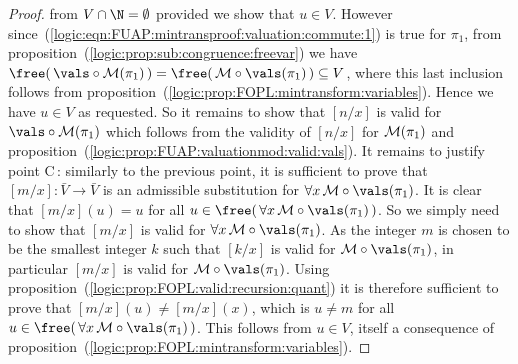 \begin{proof}
from $V\cap\N=\emptyset$ provided we show that $u\in V$. However
since~(\ref{logic:eqn:FUAP:mintransproof:valuation:commute:1}) is
true for $\pi_{1}$, from
proposition~(\ref{logic:prop:sub:congruence:freevar}) we have
$\free(\,\vals\circ{\cal M}(\pi_{1})\,)=\free(\,{\cal
M}\circ\vals(\pi_{1})\,)\subseteq V$, where this last inclusion
follows from
proposition~(\ref{logic:prop:FOPL:mintransform:variables}). Hence we
have $u\in V$ as requested. So it remains to show that $[n/x]$ is
valid for $\vals\circ{\cal M}(\pi_{1})$ which follows from the
validity of $[n/x]$ for ${\cal M}(\pi_{1})$ and
proposition~(\ref{logic:prop:FUAP:valuationmod:valid:vals}). It
remains to justify point C\,: similarly to the previous point, it is
sufficient to prove that $[m/x]:\bar{V}\to\bar{V}$ is an admissible
substitution for $\forall x\,{\cal M}\circ\vals(\pi_{1})$. It is
clear that $[m/x](u)=u$ for all $u\in\free(\,\forall x\,{\cal
M}\circ\vals(\pi_{1})\,)$. So we simply need to show that $[m/x]$ is
valid for $\forall x\,{\cal M}\circ\vals(\pi_{1})$. As the integer
$m$ is chosen to be the smallest integer $k$ such that $[k/x]$ is
valid for ${\cal M}\circ\vals(\pi_{1})$, in particular $[m/x]$ is
valid for ${\cal M}\circ\vals(\pi_{1})$. Using
proposition~(\ref{logic:prop:FOPL:valid:recursion:quant}) it is
therefore sufficient to prove that $[m/x](u)\neq[m/x](x)$, which is
$u\neq m$ for all $u\in\free(\,\forall x\,{\cal
M}\circ\vals(\pi_{1})\,)$. This follows from $u\in V$, itself a
consequence of
proposition~(\ref{logic:prop:FOPL:mintransform:variables}).
\end{proof}


